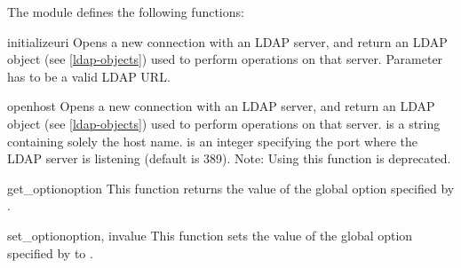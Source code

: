 The  module defines the following functions:


\begin{funcdesc}{initialize}{uri} %
  Opens a new connection with an LDAP server, and return an LDAP object
  (see \ref{ldap-objects}) used to perform operations on that server.
  Parameter  has to be a valid LDAP URL.
  \begin{seealso}
  \end{seealso}
\end{funcdesc}

\begin{funcdesc}{open}{host } %
  Opens a new connection with an LDAP server, and return an LDAP object
  (see \ref{ldap-objects}) used to perform operations on that server.
   is a string containing solely the host name. 
  is an integer specifying the port where the LDAP server is
  listening (default is 389).
  Note: Using this function is deprecated.
\end{funcdesc}

\begin{funcdesc}{get_option}{option} %
  This function returns the value of the global option
  specified by .
\end{funcdesc}

\begin{funcdesc}{set_option}{option, invalue} %
  This function sets the value of the global option
  specified by  to .
\end{funcdesc}


